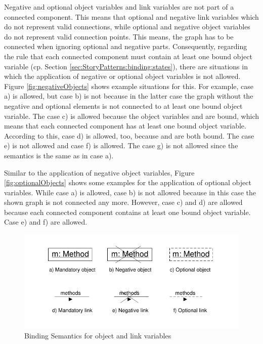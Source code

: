 Negative and optional object variables and link variables are not part of a
connected component.
This means that optional and negative link variables which do not represent
valid connections, while optional and negative
object variables do not represent valid connection points. 
This means, the graph has to be connected when ignoring optional and negative
parts. Consequently, regarding the rule that each connected component must
contain at least one bound object variable (cp. Section
\ref{sec:StoryPatterns:binding:states}), there are situations in which the
application of negative or optional object variables is not allowed. 
Figure \ref{fig:negativeObjects} shows example situations for this. 
For example, case a) is allowed, but case b) is not because in the latter case
the graph without the negative and optional elements is not connected to at
least one bound object variable. The case c) is allowed because the object
variables  and  are bound, which means that each connected component has at least one bound object variable.
According to this, case d) is allowed, too, because  and  are both
bound. The case e) is not allowed and case f) is allowed.
The case g) is not allowed since the semantics is the same as in case a).

Similar to the application of negative object
variables, Figure \ref{fig:optionalObjects} shows some examples for the application of optional object variables. 
While case a) is allowed, case b) is not allowed because in this case the
shown graph is not connected any more. However, case c) and d) are allowed
because each connected component contains at least one bound object variable.
Case e) and f) are allowed.

\begin{figure}[htbp]
  \centering
  \includegraphics[scale=1.2]{figures/BindingSemanticsOverview}
  \caption{Binding Semantics for object and link variables}
  \label{fig:bindingSemanticsOverview}
\end{figure}

